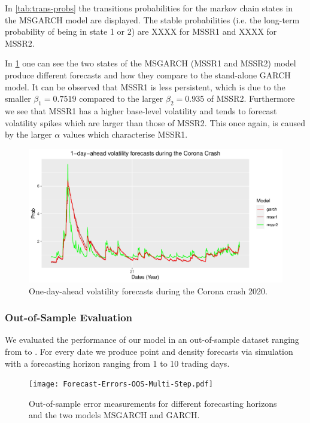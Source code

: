 \documentclass[11pt,a4paper]{article}
\begin{document}
In \cref{tab:trans-probs} the transitions probabilities for the markov chain states in the MSGARCH model are displayed. The stable probabilities (i.e. the long-term probability of being in state 1 or 2) are XXXX for MSSR1 and XXXX for MSSR2.

In \cref{img:single-state-forecasts} one can see the two states of the MSGARCH (MSSR1 and MSSR2) model produce different forecasts and how they compare to the stand-alone GARCH model. 
It can be observed that MSSR1 is less persistent, which is due to the smaller $\beta_1 = 0.7519$ compared to the larger $\beta_2 = 0.935$ of MSSR2.
Furthermore we see that MSSR1 has a higher base-level volatility and tends to forecast volatility spikes which are larger than those of MSSR2. This once again, is caused by the larger $\alpha$ values which characterise MSSR1.

\begin{figure}[H]
	\label{img:single-state-forecasts}
	\includegraphics[width=\linewidth]{CoronaCrash_MSGARCH_Decomposition.pdf}
	\caption{One-day-ahead volatility forecasts during the Corona crash 2020. }
\end{figure}


\subsubsection{Out-of-Sample Evaluation}
We evaluated the performance of our model in an out-of-sample dataset ranging from  to . For every date we produce point and density forecasts via simulation with a forecasting horizon ranging from 1 to 10 trading days.

\begin{figure}[H]
	\centering
	\label{fig:oos-error-multi-step}
	\texttt{[image: Forecast-Errors-OOS-Multi-Step.pdf]}
	\caption{Out-of-sample error measurements for different forecasting horizons and the two models MSGARCH and GARCH.}
\end{figure}
\end{document}
